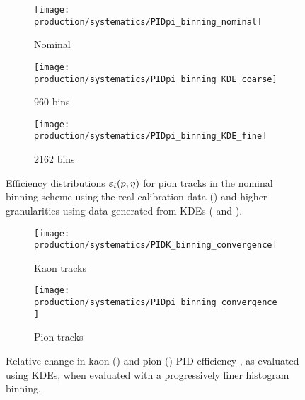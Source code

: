 \begin{figure}
  \begin{subfigure}{0.32\textwidth}
    \centering
    \texttt{[image: production/systematics/PIDpi\_binning\_nominal]}
    \caption{Nominal}
    \label{fig:prod:syst:pid:kde_2d_binning:pion:nominal}
  \end{subfigure}
  \begin{subfigure}{0.32\textwidth}
    \centering
    \texttt{[image: production/systematics/PIDpi\_binning\_KDE\_coarse]}
    \caption{960 bins}
    \label{fig:prod:syst:pid:kde_2d_binning:pion:coarse}
  \end{subfigure}
  \begin{subfigure}{0.32\textwidth}
    \centering
    \texttt{[image: production/systematics/PIDpi\_binning\_KDE\_fine]}
    \caption{2162 bins}
    \label{fig:prod:syst:pid:kde_2d_binning:pion:fine}
  \end{subfigure}

  \caption{%
    Efficiency distributions $\varepsilon_{i}(p,\eta)$ for pion tracks in the 
    nominal binning scheme using the real calibration data 
    () and higher 
    granularities using data generated from \aclp{KDE} 
    ( and 
    ).
  }
  \label{fig:prod:syst:pid:kde_2d_binning:pion}
\end{figure}

\begin{figure}
  \begin{subfigure}{0.5\textwidth}
    \centering
    \texttt{[image: production/systematics/PIDK\_binning\_convergence]}
    \caption{Kaon tracks}
    \label{fig:prod:syst:pid:convergence:kaon}
  \end{subfigure}
  \begin{subfigure}{0.5\textwidth}
    \centering
    \texttt{[image: production/systematics/PIDpi\_binning\_convergence]}
    \caption{Pion tracks}
    \label{fig:prod:syst:pid:convergence:pion}
  \end{subfigure}
  \caption{%
    Relative change in kaon () and 
    pion () \ac{PID} efficiency 
    \effpid, as evaluated using \aclp{KDE}, when evaluated with a progressively 
    finer histogram binning.
  }
  \label{fig:prod:syst:pid:convergence}
\end{figure}


